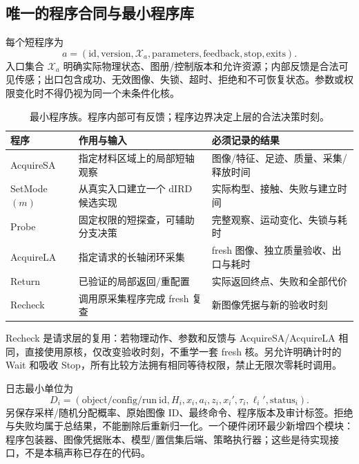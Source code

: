 \documentclass[11pt,a4paper,fontset=fandol]{ctexart}
\theoremstyle{definition}\newtheorem{definition}[theorem]{定义}
\theoremstyle{remark}\newtheorem{remark}[theorem]{说明}
\numberwithin{equation}{section}
\begin{document}
\subsection{唯一的程序合同与最小程序库}
每个短程序为
\begin{equation}
 a=(\mathrm{id},\mathrm{version},\mathcal X_a,\mathrm{parameters},
 \mathrm{feedback},\mathrm{stop},\mathrm{exits}).
 \label{eq:program}
\end{equation}
入口集合 $\mathcal X_a$ 明确实际物理状态、图册/控制版本和允许资源；内部反馈是合法可见传感；出口包含成功、无效图像、失锁、超时、拒绝和不可恢复状态。参数或权限变化时不得仍视为同一个未条件化核。

\begin{table}[htbp]\centering\small
\begin{tabularx}{\linewidth}{P{.21\linewidth}YY}\toprule
程序 & 作用与输入 & 必须记录的结果\\\midrule
AcquireSA & 指定材料区域上的局部短轴观察 & 图像/特征、足迹、质量、采集/释放时间\\
SetMode$(m)$ & 从真实入口建立一个 dIRD 候选实现 & 实际构型、接触、失败与建立时间\\
Probe & 固定权限的短探查，可辅助分支决策 & 完整观察、运动变化、失锁与耗时\\
AcquireLA & 指定请求的长轴闭环采集 & fresh 图像、独立质量验收、出口与耗时\\
Return & 已验证的局部返回/重配置 & 实际返回终点、失败和全部代价\\
Recheck & 调用原采集程序完成 fresh 复查 & 新图像凭据与新的验收时刻\\\bottomrule
\end{tabularx}
\caption{最小程序族。程序内部可有反馈；程序边界决定上层的合法决策时刻。}
\end{table}

Recheck 是请求层的复用：若物理动作、参数和反馈与 AcquireSA/AcquireLA 相同，直接使用原核，仅改变验收时刻，不重学一套 fresh 核。另允许明确计时的 Wait 和吸收 Stop，所有比较方法拥有相同等待权限，禁止无限次零耗时调用。

日志最小单位为
\begin{equation}
 D_i=(\mathrm{object/config/run\ id},H_i,x_i,a_i,
 z_i,x_i',\tau_i,\ell_i',\mathrm{status}_i).
 \label{eq:record}
\end{equation}
另保存采样/随机分配概率、原始图像 ID、最终命令、程序版本及审计标签。拒绝与失败均属于总结果，不能删除后重新归一化。一个硬件闭环最少新增四个模块：程序包装器、图像凭据账本、模型/置信集后端、策略执行器；这些是待实现接口，不是本稿声称已存在的代码。
\end{document}
